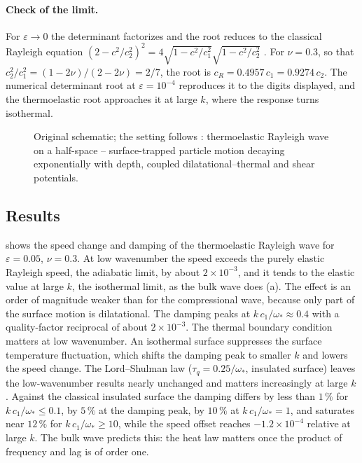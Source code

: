 \paragraph{Check of the limit.} For $\varepsilon\to0$ the determinant factorizes and the root reduces to the classical Rayleigh equation $(2-c^2/c_2^2)^2=4\sqrt{1-c^2/c_1^2}\sqrt{1-c^2/c_2^2}$ \citep{Rayleigh1885}. For $\nu=0.3$, so that $c_2^2/c_1^2=(1-2\nu)/(2-2\nu)=2/7$, the root is $c_R=0.4957\,c_1=0.9274\,c_2$. The numerical determinant root at $\varepsilon=10^{-4}$ reproduces it to the digits displayed, and the thermoelastic root approaches it at large $k$, where the response turns isothermal.
\begin{figure}[t!]\centering\small

\caption{Original schematic; the setting follows \citep{Rayleigh1885}: thermoelastic Rayleigh wave on a half-space -- surface-trapped particle motion decaying exponentially with depth, coupled dilatational--thermal and shear potentials.}\label{fig:rayleigh-geo}
\end{figure}

\subsection{Results}
 shows the speed change and damping of the thermoelastic Rayleigh wave for $\varepsilon=0.05$, $\nu=0.3$. At low wavenumber the speed exceeds the purely elastic Rayleigh speed, the adiabatic limit, by about $2\times10^{-3}$, and it tends to the elastic value at large $k$, the isothermal limit, as the bulk wave does (a). The effect is an order of magnitude weaker than for the compressional wave, because only part of the surface motion is dilatational. The damping peaks at $k\,c_1/\omega_*\approx0.4$ with a quality-factor reciprocal of about $2\times10^{-3}$. The thermal boundary condition matters at low wavenumber. An isothermal surface suppresses the surface temperature fluctuation, which shifts the damping peak to smaller $k$ and lowers the speed change. The Lord--Shulman law ($\tau_q=0.25/\omega_*$, insulated surface) leaves the low-wavenumber results nearly unchanged and matters increasingly at large $k$. Against the classical insulated surface the damping differs by less than $1\,\%$ for $k\,c_1/\omega_*\le0.1$, by $5\,\%$ at the damping peak, by $10\,\%$ at $k\,c_1/\omega_*=1$, and saturates near $12\,\%$ for $k\,c_1/\omega_*\ge10$, while the speed offset reaches $-1.2\times10^{-4}$ relative at large $k$. The bulk wave predicts this: the heat law matters once the product of frequency and lag is of order one.

